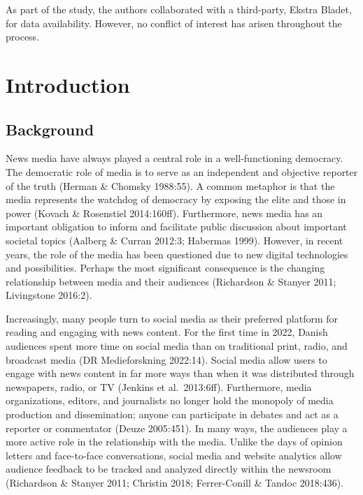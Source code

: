 \documentclass[
]{article}
\begin{document}
As part of the study, the authors collaborated with a third-party,
Ekstra Bladet, for data availability. However, no conflict of interest
has arisen throughout the process.

\pagebreak

\singlespacing

\setcounter{tocdepth}{3}
\tableofcontents

\pagebreak

\onehalfspacing 

\hypertarget{introduction}{%
\section{Introduction}\label{introduction}}

\hypertarget{background}{%
\subsection{Background}\label{background}}

News media have always played a central role in a well-functioning
democracy. The democratic role of media is to serve as an independent
and objective reporter of the truth (Herman \& Chomsky 1988:55). A
common metaphor is that the media represents the watchdog of democracy
by exposing the elite and those in power (Kovach \& Rosenstiel
2014:160ff). Furthermore, news media has an important obligation to
inform and facilitate public discussion about important societal topics
(Aalberg \& Curran 2012:3; Habermas 1999). However, in recent years, the
role of the media has been questioned due to new digital technologies
and possibilities. Perhaps the most significant consequence is the
changing relationship between media and their audiences (Richardson \&
Stanyer 2011; Livingstone 2016:2).

Increasingly, many people turn to social media as their preferred
platform for reading and engaging with news content. For the first time
in 2022, Danish audiences spent more time on social media than on
traditional print, radio, and broadcast media (DR Medieforskning
2022:14). Social media allow users to engage with news content in far
more ways than when it was distributed through newspapers, radio, or TV
(Jenkins et al.~2013:6ff). Furthermore, media organizations, editors,
and journalists no longer hold the monopoly of media production and
dissemination; anyone can participate in debates and act as a reporter
or commentator (Deuze 2005:451). In many ways, the audiences play a more
active role in the relationship with the media. Unlike the days of
opinion letters and face-to-face conversations, social media and website
analytics allow audience feedback to be tracked and analyzed directly
within the newsroom (Richardson \& Stanyer 2011; Christin 2018;
Ferrer-Conill \& Tandoc 2018:436).
\end{document}
